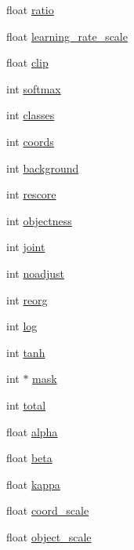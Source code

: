 \begin{DoxyCompactItemize}
\item 
float \mbox{\hyperlink{structlayer_a2752501fc00b1ff2bdd19e0a24b5370c}{ratio}}
\item 
float \mbox{\hyperlink{structlayer_a329f298275a866fae317080159336d98}{learning\+\_\+rate\+\_\+scale}}
\item 
float \mbox{\hyperlink{structlayer_a1728042fca5440265c959059a869bd2f}{clip}}
\item 
int \mbox{\hyperlink{structlayer_a7b07ddac3afad25586ff7c18956ba9a9}{softmax}}
\item 
int \mbox{\hyperlink{structlayer_af8d01e54a44d8682c38d431c32faed45}{classes}}
\item 
int \mbox{\hyperlink{structlayer_a6b8636464bcea5dea2c2235ee133af29}{coords}}
\item 
int \mbox{\hyperlink{structlayer_a509601d552c5e188902dc7cfddfe6ee4}{background}}
\item 
int \mbox{\hyperlink{structlayer_a662867ba4218e923a302fd215dab2ddd}{rescore}}
\item 
int \mbox{\hyperlink{structlayer_aaf0a24ead54282e6bbb9c766f357c57f}{objectness}}
\item 
int \mbox{\hyperlink{structlayer_aac680bb3fa86a374a0252fff77bb887d}{joint}}
\item 
int \mbox{\hyperlink{structlayer_addd7dd5ca8a7ce6bb15aa2d06efe69ee}{noadjust}}
\item 
int \mbox{\hyperlink{structlayer_a13f7dcacfefce8f8f5694dad9e5aa6ae}{reorg}}
\item 
int \mbox{\hyperlink{structlayer_a540b5bcf6b30bef535ff82e133bffd79}{log}}
\item 
int \mbox{\hyperlink{structlayer_a386df76b9ede3725ade44f66c45ecdcb}{tanh}}
\item 
int $\ast$ \mbox{\hyperlink{structlayer_aaa82c8e027d08dfd571c663653f85588}{mask}}
\item 
int \mbox{\hyperlink{structlayer_a5899baa591f5d9e897b6af62b0fd13e0}{total}}
\item 
float \mbox{\hyperlink{structlayer_aa9495e20d42d431aa52dd4eedb03e8b5}{alpha}}
\item 
float \mbox{\hyperlink{structlayer_a375acd63c42b47b9c3007a1c064caef7}{beta}}
\item 
float \mbox{\hyperlink{structlayer_ac8ee04d5346e8f3d682ebc02e8a6b663}{kappa}}
\item 
float \mbox{\hyperlink{structlayer_a4cb681c94203182c328d7818bcb39de8}{coord\+\_\+scale}}
\item 
float \mbox{\hyperlink{structlayer_a502c7f71d253c01f1724adbe8bc585fc}{object\+\_\+scale}}

\end{DoxyCompactItemize}
